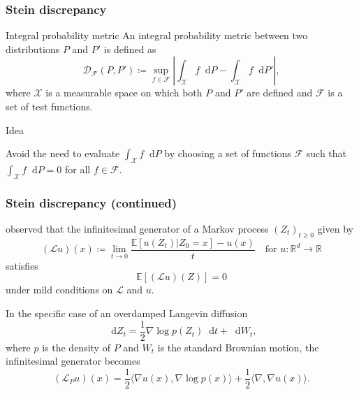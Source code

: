 \documentclass{beamer}
\newcommand*\diff{\mathop{}\!\mathrm{d}}
\begin{document}
\begin{frame}
\frametitle{Stein discrepancy}

\begin{block}{Integral probability metric}
An integral probability metric between two distributions $P$ and $P'$ is defined as
\begin{equation*}
\mathcal{D}_{\mathcal{F}}(P, P') \coloneq \sup_{f \in \mathcal{F}}\left|\int_\mathcal{X} f \diff P - \int_\mathcal{X} f \diff P' \right|,
\label{eq:ipm}
\end{equation*}
where $\mathcal{X}$ is a measurable space on which both $P$ and $P'$ are defined and $\mathcal{F}$ is a set of test functions.
\end{block}

\begin{block}{Idea}

Avoid the need to evaluate $\int_\mathcal{X} f \diff P$ by choosing a set of functions $\mathcal{F}$ such that $\int_\mathcal{X} f \diff P = 0$ for all $f \in \mathcal{F}$.

\end{block}

\end{frame}

\begin{frame}
\frametitle{Stein discrepancy (continued)}

\cite{gorhamMeasuringSampleQuality2015} observed that the infinitesimal generator of a Markov process $(Z_t)_{t \geq 0}$ given by
\begin{equation*}
(\mathcal{L}u)(x) \coloneq \lim_{t \to 0} \frac{\mathbb{E}[u(Z_t) | Z_0 = x] - u(x)}{t} \quad \text{for } u:\mathbb{R}^d \to \mathbb{R}
\end{equation*}
satisfies
\begin{equation*}
\mathbb{E}[(\mathcal{L} u) (Z)] = 0
\end{equation*}
under mild conditions on $\mathcal{L}$ and $u$.

In the specific case of an overdamped Langevin diffusion
$$\diff Z_t = \frac{1}{2} \nabla \log p(Z_t) \diff t + \diff W_t,$$
where $p$ is the density of $P$ and $W_t$ is the standard Brownian motion, the infinitesimal generator becomes
$$(\mathcal{L}_P u)(x) = \frac{1}{2} \langle \nabla u(x), \nabla \log p(x)\rangle + \frac{1}{2}\langle \nabla, \nabla u(x) \rangle.$$

\end{frame}
\end{document}
